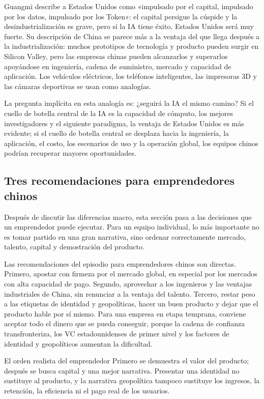 Guangmi describe a Estados Unidos como «impulsado por el capital, impulsado por los datos, impulsado por los Token»: el capital persigue la cúspide y la desindustrialización es grave, pero si la IA tiene éxito, Estados Unidos será muy fuerte. Su descripción de China se parece más a la ventaja del que llega después a la industrialización: muchos prototipos de tecnología y producto pueden surgir en Silicon Valley, pero las empresas chinas pueden alcanzarlos y superarlos apoyándose en ingeniería, cadena de suministro, mercado y capacidad de aplicación. Los vehículos eléctricos, los teléfonos inteligentes, las impresoras 3D y las cámaras deportivas se usan como analogías.

La pregunta implícita en esta analogía es: ¿seguirá la IA el mismo camino? Si el cuello de botella central de la IA es la capacidad de cómputo, los mejores investigadores y el siguiente paradigma, la ventaja de Estados Unidos es más evidente; si el cuello de botella central se desplaza hacia la ingeniería, la aplicación, el costo, los escenarios de uso y la operación global, los equipos chinos podrían recuperar mayores oportunidades.

\subsection{Tres recomendaciones para emprendedores chinos}

Después de discutir las diferencias macro, esta sección pasa a las decisiones que un emprendedor puede ejecutar. Para un equipo individual, lo más importante no es tomar partido en una gran narrativa, sino ordenar correctamente mercado, talento, capital y demostración del producto.

Las recomendaciones del episodio para emprendedores chinos son directas. Primero, apostar con firmeza por el mercado global, en especial por los mercados con alta capacidad de pago. Segundo, aprovechar a los ingenieros y las ventajas industriales de China, sin renunciar a la ventaja del talento. Tercero, restar peso a las etiquetas de identidad y geopolíticas, hacer un buen producto y dejar que el producto hable por sí mismo. Para una empresa en etapa temprana, conviene aceptar todo el dinero que se pueda conseguir, porque la cadena de confianza transfronteriza, los VC estadounidenses de primer nivel y los factores de identidad y geopolíticos aumentan la dificultad.

\begin{importantbox}{El orden realista del emprendedor}
Primero se demuestra el valor del producto; después se busca capital y una mejor narrativa. Presentar una identidad no sustituye al producto, y la narrativa geopolítica tampoco sustituye los ingresos, la retención, la eficiencia ni el pago real de los usuarios.
\end{importantbox}

